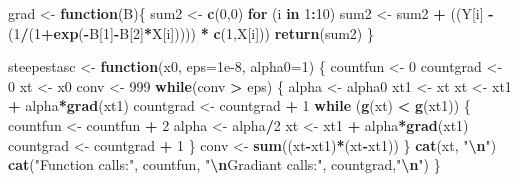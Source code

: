 \documentclass[
]{article}
\newenvironment{Shaded}{\begin{snugshade}}{\end{snugshade}}
\newcommand{\AttributeTok}[1]{\textcolor[rgb]{0.13,0.29,0.53}{#1}}
\newcommand{\ControlFlowTok}[1]{\textcolor[rgb]{0.13,0.29,0.53}{\textbf{#1}}}
\newcommand{\DecValTok}[1]{\textcolor[rgb]{0.00,0.00,0.81}{#1}}
\newcommand{\FloatTok}[1]{\textcolor[rgb]{0.00,0.00,0.81}{#1}}
\newcommand{\FunctionTok}[1]{\textcolor[rgb]{0.13,0.29,0.53}{\textbf{#1}}}
\newcommand{\NormalTok}[1]{#1}
\newcommand{\OtherTok}[1]{\textcolor[rgb]{0.56,0.35,0.01}{#1}}
\newcommand{\SpecialCharTok}[1]{\textcolor[rgb]{0.81,0.36,0.00}{\textbf{#1}}}
\newcommand{\StringTok}[1]{\textcolor[rgb]{0.31,0.60,0.02}{#1}}
\begin{document}
\begin{Shaded}
\begin{Highlighting}[]
\NormalTok{grad }\OtherTok{\textless{}{-}} \ControlFlowTok{function}\NormalTok{(B)\{}
\NormalTok{  sum2 }\OtherTok{\textless{}{-}} \FunctionTok{c}\NormalTok{(}\DecValTok{0}\NormalTok{,}\DecValTok{0}\NormalTok{)}
  \ControlFlowTok{for}\NormalTok{ (i }\ControlFlowTok{in} \DecValTok{1}\SpecialCharTok{:}\DecValTok{10}\NormalTok{)}
\NormalTok{    sum2 }\OtherTok{\textless{}{-}}\NormalTok{ sum2 }\SpecialCharTok{+}\NormalTok{ ((Y[i] }\SpecialCharTok{{-}}\NormalTok{ (}\DecValTok{1}\SpecialCharTok{/}\NormalTok{(}\DecValTok{1}\SpecialCharTok{+}\FunctionTok{exp}\NormalTok{(}\SpecialCharTok{{-}}\NormalTok{B[}\DecValTok{1}\NormalTok{]}\SpecialCharTok{{-}}\NormalTok{B[}\DecValTok{2}\NormalTok{]}\SpecialCharTok{*}\NormalTok{X[i])))) }\SpecialCharTok{*} \FunctionTok{c}\NormalTok{(}\DecValTok{1}\NormalTok{,X[i]))}
  \FunctionTok{return}\NormalTok{(sum2)}
\NormalTok{\}}

\NormalTok{steepestasc }\OtherTok{\textless{}{-}} \ControlFlowTok{function}\NormalTok{(x0, }\AttributeTok{eps=}\FloatTok{1e{-}8}\NormalTok{, }\AttributeTok{alpha0=}\DecValTok{1}\NormalTok{)}
\NormalTok{\{}
\NormalTok{  countfun }\OtherTok{\textless{}{-}} \DecValTok{0}
\NormalTok{  countgrad }\OtherTok{\textless{}{-}} \DecValTok{0}
\NormalTok{  xt   }\OtherTok{\textless{}{-}}\NormalTok{ x0}
\NormalTok{  conv }\OtherTok{\textless{}{-}} \DecValTok{999}
  \ControlFlowTok{while}\NormalTok{(conv }\SpecialCharTok{\textgreater{}}\NormalTok{ eps)}
\NormalTok{  \{}
\NormalTok{    alpha }\OtherTok{\textless{}{-}}\NormalTok{ alpha0}
\NormalTok{    xt1   }\OtherTok{\textless{}{-}}\NormalTok{ xt}
\NormalTok{    xt    }\OtherTok{\textless{}{-}}\NormalTok{ xt1 }\SpecialCharTok{+}\NormalTok{ alpha}\SpecialCharTok{*}\FunctionTok{grad}\NormalTok{(xt1)}
\NormalTok{    countgrad }\OtherTok{\textless{}{-}}\NormalTok{ countgrad }\SpecialCharTok{+} \DecValTok{1}
    \ControlFlowTok{while}\NormalTok{ (}\FunctionTok{g}\NormalTok{(xt) }\SpecialCharTok{\textless{}} \FunctionTok{g}\NormalTok{(xt1))}
\NormalTok{    \{}
\NormalTok{      countfun }\OtherTok{\textless{}{-}}\NormalTok{ countfun }\SpecialCharTok{+} \DecValTok{2}
\NormalTok{      alpha }\OtherTok{\textless{}{-}}\NormalTok{ alpha}\SpecialCharTok{/}\DecValTok{2}
\NormalTok{      xt    }\OtherTok{\textless{}{-}}\NormalTok{ xt1 }\SpecialCharTok{+}\NormalTok{ alpha}\SpecialCharTok{*}\FunctionTok{grad}\NormalTok{(xt1)}
\NormalTok{      countgrad }\OtherTok{\textless{}{-}}\NormalTok{ countgrad }\SpecialCharTok{+} \DecValTok{1}
\NormalTok{    \}}
\NormalTok{    conv }\OtherTok{\textless{}{-}} \FunctionTok{sum}\NormalTok{((xt}\SpecialCharTok{{-}}\NormalTok{xt1)}\SpecialCharTok{*}\NormalTok{(xt}\SpecialCharTok{{-}}\NormalTok{xt1))}
\NormalTok{  \}}
  \FunctionTok{cat}\NormalTok{(xt, }\StringTok{"}\SpecialCharTok{\textbackslash{}n}\StringTok{"}\NormalTok{)}
  \FunctionTok{cat}\NormalTok{(}\StringTok{"Function calls:"}\NormalTok{, countfun, }\StringTok{"}\SpecialCharTok{\textbackslash{}n}\StringTok{Gradiant calls:"}\NormalTok{, countgrad,}\StringTok{"}\SpecialCharTok{\textbackslash{}n}\StringTok{"}\NormalTok{)}
\NormalTok{\}}
\end{Highlighting}
\end{Shaded}
\end{document}
